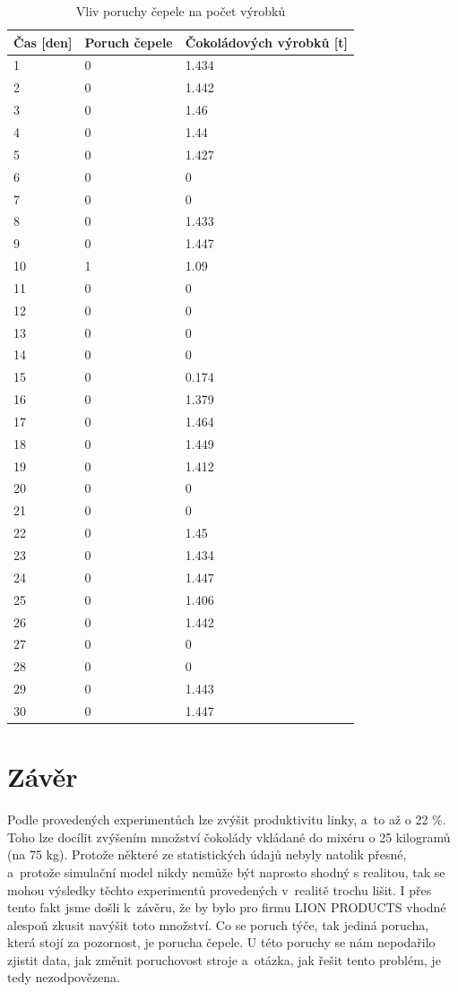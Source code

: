 \documentclass[11pt,a4paper,titlepage]{article}
\begin{document}
			\begin{table}[htb]
			    \centering
			    \begin{tabular}{|l|l|l|}
			    \hline
			    Čas [den] & Poruch čepele &  Čokoládových výrobků [t] \\ \hline
			    1  & 0 & 1.434 \\
			    2  & 0 & 1.442 \\
			    3  & 0 &  1.46 \\
			    4  & 0 &  1.44 \\
			    5  & 0 &  1.427 \\
			    6  & 0 &  0 \\
			    7  & 0 &  0 \\
			    8  & 0 &  1.433 \\
			    9  & 0 &  1.447 \\
			    10 & 1 &  1.09 \\
			    11 & 0 &  0 \\
			    12 & 0 &  0 \\
			    13 & 0 &  0 \\
			    14 & 0 &  0 \\
			    15 & 0 &  0.174 \\
			    16 & 0 &  1.379 \\
			    17 & 0 &  1.464 \\
			    18 & 0 &  1.449 \\
			    19 & 0 &  1.412 \\
			    20 & 0 &  0 \\
			    21 & 0 &  0 \\
			    22 & 0 &  1.45 \\
			    23 & 0 &  1.434 \\
			    24 & 0 &  1.447 \\
			    25 & 0 &  1.406 \\
			    26 & 0 &  1.442 \\
			    27 & 0 &  0 \\
			    28 & 0 &  0 \\
			    29 & 0 &  1.443 \\
			    30 & 0 &  1.447 \\ \hline
			    \end{tabular}
			    \caption{Vliv poruchy čepele na počet výrobků}
			    \label{table:experiment_cepel}
			\end{table}
	\section{Závěr}
		Podle provedených experimentůch lze zvýšit produktivitu linky, a~to až o 22 \%.
		Toho lze docílit zvýšením množství čokolády vkládané do mixéru o 25 kilogramů (na 75 kg).
		Protože některé ze statistických údajů nebyly natolik přesné, a~protože simulační model
		nikdy nemůže být naprosto shodný s realitou, tak se mohou výsledky těchto experimentů
		provedených v~realitě trochu lišit. I přes tento fakt jsme došli k~závěru, že
		by bylo pro firmu LION PRODUCTS vhodné alespoň zkusit navýšit toto množství. Co se
		poruch týče, tak jediná porucha, která stojí za pozornost, je porucha čepele. U této
		poruchy se nám nepodařilo zjistit data, jak změnit poruchovost stroje a~otázka,
		jak řešit tento problém, je tedy nezodpovězena.
	\newpage
	
\end{document}
